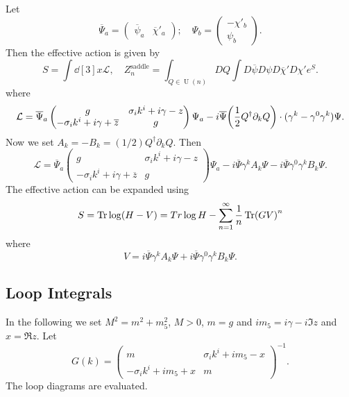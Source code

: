 \documentclass[letterpaper]{article}
\begin{document}
Let
\[ \overline{\Psi}_a = \begin{pmatrix}
    \overline{\psi}_a & \overline{\chi}'_a
\end{pmatrix};\quad \Psi_b = \begin{pmatrix}
    -\chi'_b \\ \psi_b 
\end{pmatrix}. \]
Then the effective action is given by
\[ S = \int \dd[3]{x} \mathcal{L}, \quad Z_n^{\text{saddle}} = \int_{Q\in \operatorname{U}(n)} DQ \int D{\overline{\psi}}D{{\psi}}D{\overline{\chi}'}D{{\chi}'} e^S. \]
where
\[ \mathcal{L} = \overline{\Psi}_a \begin{pmatrix}
    g & \sigma_i k^i + i\gamma - z \\
    -\sigma_i k^i + i\gamma + \overline{z} & g
\end{pmatrix} \Psi_a - i\overline{\Psi} \qty(\frac{1}{2} Q^\dagger \partial_k Q) \cdot (\gamma^k - \gamma^0 \gamma^k) \Psi. \]
Now we set $A_k = -B_k = (1/2) Q^\dagger \partial_k Q$.
Then
\[ \mathcal{L} = \overline{\Psi}_a \begin{pmatrix}
    g & \sigma_i k^i + i\gamma - z \\
    -\sigma_i k^i + i\gamma + \overline{z} & g
\end{pmatrix} \Psi_a - i\overline{\Psi} \gamma^k A_k \Psi - i\overline{\Psi} \gamma^0 \gamma^k B_k \Psi. \]
The effective action can be expanded using
\[ S = \Tr \log (H - V) = Tr\log H - \sum_{n=1}^\infty \frac{1}{n} \Tr(G V)^n \]
where
\[ V = i\overline{\Psi} \gamma^k A_k \Psi + i\overline{\Psi} \gamma^0 \gamma^k B_k \Psi. \]

\subsection*{Loop Integrals}

In the following we set $M^2 = m^2 + m_5^2$, $M>0$, $m = g$ and $im_5 = i\gamma - i \Im z$ and $x = \Re z$.
Let
\[ G(k) = \begin{pmatrix}
    m & \sigma_i k^i + im_5 - x \\
    -\sigma_i k^i + im_5 + x & m
\end{pmatrix}^{-1}. \]
The loop diagrams are evaluated.
\end{document}
